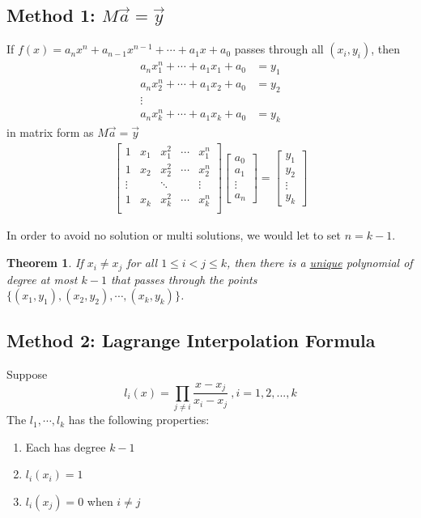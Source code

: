 \documentclass[11pt,a4paper]{article}
\newtheorem{theorem}{Theorem}
\begin{document}
\subsection{Method 1: $M\vec{a}=\vec{y}$}
If $f(x)=a_nx^n+a_{n-1}x^{n-1}+\cdots+a_1x+a_0$ passes through all $(x_i,y_i)$, then
\begin{equation}
    \begin{aligned}
        a_nx_1^n+\cdots+a_1x_1+a_0&=y_1\\
        a_nx_2^n+\cdots+a_1x_2+a_0&=y_2\\
        \vdots\quad &\\
        a_nx_k^n+\cdots+a_1x_k+a_0&=y_k
    \end{aligned}
    \nonumber
\end{equation}
in matrix form as $M\vec{a}=\vec{y}$
\begin{equation}
    \begin{aligned}
        \begin{bmatrix}
            1&x_1&x_1^2&\cdots&x_1^n\\
            1&x_2&x_2^2&\cdots&x_2^n\\
            \vdots&&\ddots&&\vdots\\
            1&x_k&x_k^2&\cdots&x_k^n\\
        \end{bmatrix}
        \begin{bmatrix}a_0\\a_1\\ \vdots\\a_n\end{bmatrix}=\begin{bmatrix}y_1\\y_2\\ \vdots\\y_k\end{bmatrix}
    \end{aligned}
    \nonumber
\end{equation}

In order to avoid no solution or multi solutions, we would let to set $n=k-1$.

\begin{theorem}
    If $x_i\neq x_j$ for all $1\leq i<j\leq k$, then there is a \underline{unique} polynomial of degree at most $k-1$ that passes through the points $\{(x_1,y_1),(x_2,y_2),\cdots,(x_k,y_k)\}$.
\end{theorem}

\subsection{Method 2: Lagrange Interpolation Formula}
Suppose $$l_i(x)=\prod_{j\neq i}\frac{x-x_j}{x_i-x_j}\ ,i=1,2,...,k$$
The $l_1,\cdots,l_k$ has the following properties:
\begin{enumerate}[$\bullet$]
    \item Each has degree $k-1$
    \item $l_i(x_i)=1$
    \item $l_i(x_j)=0$ when $i\neq j$
\end{enumerate}
\end{document}
